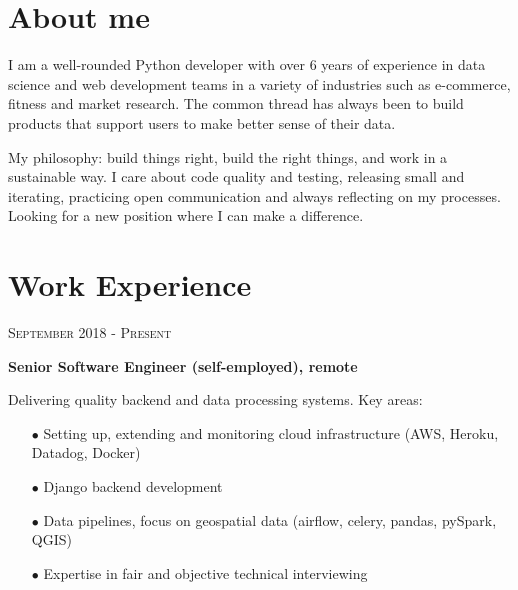 \documentclass[9pt]{article} %
\begin{document}
\begin{minipage}[t]{0.5\textwidth} %
\vspace{0pt} %
	



\section{About me} 


\normalsize{I am a well-rounded Python developer with over 6 years of experience in data science and web development teams in a variety of industries such as e-commerce, fitness and market research. The common thread has always been to build products that support users to make better sense of their data.
    
My philosophy: build things right, build the right things, and work in a sustainable way. I care about code quality and testing, releasing small and iterating, practicing open communication and always reflecting on my processes. Looking for a new position where I can make a difference.}
	



\section{Work Experience} 

{\raggedleft\textsc{September 2018 - Present}\par}

    {\raggedright\large \textbf{Senior Software Engineer (self-employed), remote}\\
}

\normalsize{Delivering quality backend and data processing systems. Key areas:}
\begin{itemize}
    \item[$\bullet$] Setting up, extending and monitoring cloud infrastructure (AWS, Heroku, Datadog, Docker)
\item[$\bullet$] Django backend development
\item[$\bullet$] Data pipelines, focus on geospatial data (airflow, celery, pandas, pySpark, QGIS)
\item[$\bullet$] Expertise in fair and objective technical interviewing
\end{itemize}


\end{minipage}
\end{document}
